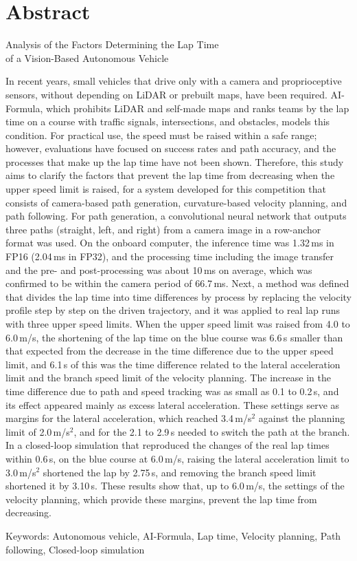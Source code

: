 \chapter*{Abstract}
\thispagestyle{empty}
\enlargethispage{\baselineskip}

\begin{center}
{\large Analysis of the Factors Determining the Lap Time\\of a Vision-Based Autonomous Vehicle}
\end{center}

{\small\renewcommand{\baselinestretch}{1.0}\selectfont
In recent years, small vehicles that drive only with a camera and proprioceptive sensors, without depending on LiDAR or prebuilt maps, have been required. AI-Formula, which prohibits LiDAR and self-made maps and ranks teams by the lap time on a course with traffic signals, intersections, and obstacles, models this condition. For practical use, the speed must be raised within a safe range; however, evaluations have focused on success rates and path accuracy, and the processes that make up the lap time have not been shown. Therefore, this study aims to clarify the factors that prevent the lap time from decreasing when the upper speed limit is raised, for a system developed for this competition that consists of camera-based path generation, curvature-based velocity planning, and path following. For path generation, a convolutional neural network that outputs three paths (straight, left, and right) from a camera image in a row-anchor format was used. On the onboard computer, the inference time was 1.32\,ms in FP16 (2.04\,ms in FP32), and the processing time including the image transfer and the pre- and post-processing was about 10\,ms on average, which was confirmed to be within the camera period of 66.7\,ms. Next, a method was defined that divides the lap time into time differences by process by replacing the velocity profile step by step on the driven trajectory, and it was applied to real lap runs with three upper speed limits. When the upper speed limit was raised from 4.0 to 6.0\,m/s, the shortening of the lap time on the blue course was 6.6\,s smaller than that expected from the decrease in the time difference due to the upper speed limit, and 6.1\,s of this was the time difference related to the lateral acceleration limit and the branch speed limit of the velocity planning. The increase in the time difference due to path and speed tracking was as small as 0.1 to 0.2\,s, and its effect appeared mainly as excess lateral acceleration. These settings serve as margins for the lateral acceleration, which reached 3.4\,m/s$^2$ against the planning limit of 2.0\,m/s$^2$, and for the 2.1 to 2.9\,s needed to switch the path at the branch. In a closed-loop simulation that reproduced the changes of the real lap times within 0.6\,s, on the blue course at 6.0\,m/s, raising the lateral acceleration limit to 3.0\,m/s$^2$ shortened the lap by 2.75\,s, and removing the branch speed limit shortened it by 3.10\,s. These results show that, up to 6.0\,m/s, the settings of the velocity planning, which provide these margins, prevent the lap time from decreasing.

\vspace{0.5\zh}
\noindent Keywords: Autonomous vehicle, AI-Formula, Lap time, Velocity planning, Path following, Closed-loop simulation
}
